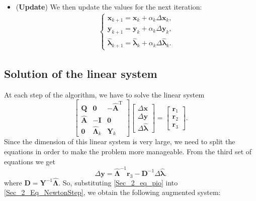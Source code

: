 \begin{itemize}
    \item (\textbf{Update}) We then update the values for the next iteration:
    \begin{align}
    \begin{cases}
        \bm{x}_{k+1} = \bm{x}_{k} + \alpha_{k}\Delta\bm{x}_k,\\
        \bm{y}_{k+1} = \bm{y}_{k} + \alpha_{k}\Delta\bm{y}_k,\\
        \hat{\bm{\lambda}}_{k+1} = \hat{\bm{\lambda}}_{k} + \alpha_{k}\Delta\hat{\bm{\lambda}}_k.
    \end{cases}\label{Sec3_Eq_sugoma}
    \end{align}
\end{itemize}

\subsection{Solution of the linear system}
At each step of the algorithm, we have to solve the linear system
\begin{equation} \label{Sec_2_Eq_NewtonStep}
    \begin{bmatrix}
        \mathbf{Q} & \mathbf{0} & -\hat{\mathbf{A}}^\mathrm{T}\\
        \hat{\mathbf{A}} & -\mathbf{I} & \mathbf{0} \\
        \mathbf{0} & \hat{\mathbf{\Lambda}}_k &\mathbf{Y}_k
    \end{bmatrix} 
    \begin{bmatrix}
        \Delta \bm{x} \\ \Delta \bm{y} \\ \Delta \hat{\bm{\lambda}} 
    \end{bmatrix} =
    \begin{bmatrix}
        \bm{r}_1 \\ \bm{r}_2 \\ \bm{r}_3
    \end{bmatrix}.
\end{equation}
%
Since the dimension of this linear system is very large, we need to split the equations in order to make the problem more manageable. From the third set of equations we get
\begin{equation} \label{Sec_2_eq_pio}
    \Delta \bm{y} = \hat{\mathbf{\Lambda}}^{-1} \bm{r}_3 -  \mathbf{D}^{-1}\Delta \hat{\bm{\lambda}}.
\end{equation}
where $\mathbf{D} = \mathbf{Y}^{-1}\hat{\mathbf{\Lambda}}$.
So, substituting \ref{Sec_2_eq_pio} into \ref{Sec_2_Eq_NewtonStep}, we obtain the following augmented system:
